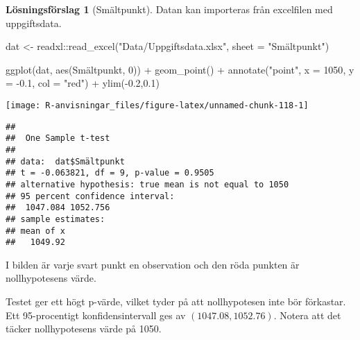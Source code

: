 \documentclass[
]{book}
\newenvironment{Shaded}{\begin{snugshade}}{\end{snugshade}}
\newcommand{\AttributeTok}[1]{\textcolor[rgb]{0.77,0.63,0.00}{#1}}
\newcommand{\DecValTok}[1]{\textcolor[rgb]{0.00,0.00,0.81}{#1}}
\newcommand{\FloatTok}[1]{\textcolor[rgb]{0.00,0.00,0.81}{#1}}
\newcommand{\FunctionTok}[1]{\textcolor[rgb]{0.00,0.00,0.00}{#1}}
\newcommand{\NormalTok}[1]{#1}
\newcommand{\OtherTok}[1]{\textcolor[rgb]{0.56,0.35,0.01}{#1}}
\newcommand{\SpecialCharTok}[1]{\textcolor[rgb]{0.00,0.00,0.00}{#1}}
\newcommand{\StringTok}[1]{\textcolor[rgb]{0.31,0.60,0.02}{#1}}
\theoremstyle{definition}
\theoremstyle{definition}
\theoremstyle{definition}
\theoremstyle{definition}
\newtheorem{hypothesis}{Lösningsförslag}[chapter]
\theoremstyle{remark}
\begin{document}
\begin{hypothesis}[Smältpunkt]
Datan kan importeras från excelfilen med uppgiftsdata.

\begin{Shaded}
\begin{Highlighting}[]
\NormalTok{dat }\OtherTok{\textless{}{-}}\NormalTok{ readxl}\SpecialCharTok{::}\FunctionTok{read\_excel}\NormalTok{(}\StringTok{"Data/Uppgiftsdata.xlsx"}\NormalTok{, }\AttributeTok{sheet =} \StringTok{"Smältpunkt"}\NormalTok{)}

\FunctionTok{ggplot}\NormalTok{(dat, }\FunctionTok{aes}\NormalTok{(Smältpunkt, }\DecValTok{0}\NormalTok{)) }\SpecialCharTok{+}
  \FunctionTok{geom\_point}\NormalTok{() }\SpecialCharTok{+}
  \FunctionTok{annotate}\NormalTok{(}\StringTok{"point"}\NormalTok{, }\AttributeTok{x =} \DecValTok{1050}\NormalTok{, }\AttributeTok{y =} \SpecialCharTok{{-}}\FloatTok{0.1}\NormalTok{, }\AttributeTok{col =} \StringTok{"red"}\NormalTok{) }\SpecialCharTok{+}
  \FunctionTok{ylim}\NormalTok{(}\SpecialCharTok{{-}}\FloatTok{0.2}\NormalTok{,}\FloatTok{0.1}\NormalTok{)}
\end{Highlighting}
\end{Shaded}

\begin{center}\texttt{[image: R-anvisningar\_files/figure-latex/unnamed-chunk-118-1]} \end{center}

\begin{Shaded}
\end{Shaded}

\begin{verbatim}
## 
##  One Sample t-test
## 
## data:  dat$Smältpunkt
## t = -0.063821, df = 9, p-value = 0.9505
## alternative hypothesis: true mean is not equal to 1050
## 95 percent confidence interval:
##  1047.084 1052.756
## sample estimates:
## mean of x 
##   1049.92
\end{verbatim}

I bilden är varje svart punkt en observation och den röda punkten är nollhypotesens värde.

Testet ger ett högt p-värde, vilket tyder på att nollhypotesen inte bör förkastar. Ett 95-procentigt konfidensintervall ges av \((1047.08, 1052.76)\). Notera att det täcker nollhypotesens värde på 1050.
\end{hypothesis}
\end{document}

